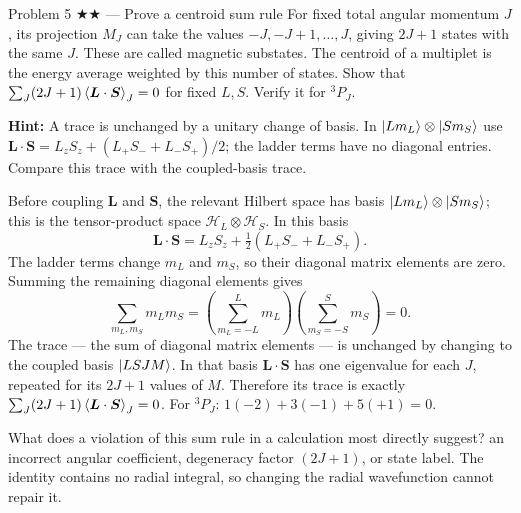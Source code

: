 \documentclass[11pt]{article}
\begin{document}
\begin{problem}{Problem 5 ★★ — Prove a centroid sum rule}
For fixed total angular momentum $J$, its projection $M_J$ can take the values
$-J,-J+1,\ldots,J$, giving $2J+1$ states with the same $J$. These are called
magnetic substates. The centroid of a multiplet is the energy average weighted
by this number of states. Show that
$\sum_J(2J+1)\left\langle \bm L\cdot\bm S\right\rangle_J=0$ for fixed $L,S$. Verify it for
$^3P_J$.

\textbf{Hint:} A trace is unchanged by a unitary change of basis.
In $\lvert Lm_L\rangle\otimes\lvert Sm_S\rangle$ use
$\bm L\cdot\bm S=L_zS_z+(L_+S_-+L_-S_+)/2$; the ladder terms have no
diagonal entries. Compare this trace with the coupled-basis trace.
\end{problem}
\begin{solution}
Before coupling $\bm L$ and $\bm S$, the relevant Hilbert space has basis
$\lvert Lm_L\rangle\otimes\lvert Sm_S\rangle$; this is the tensor-product space
$\mathcal H_L\otimes\mathcal H_S$. In this basis
\[
\bm L\cdot\bm S=L_zS_z+\tfrac12(L_+S_-+L_-S_+).
\]
The ladder terms change $m_L$ and $m_S$, so their diagonal matrix elements are
zero. Summing the remaining diagonal elements gives
\[
\sum_{m_L,m_S}m_Lm_S=
\left(\sum_{m_L=-L}^{L}m_L\right)
\left(\sum_{m_S=-S}^{S}m_S\right)=0.
\]
The trace --- the sum of diagonal matrix elements --- is unchanged by changing
to the coupled basis $\lvert LSJM\rangle$. In that basis $\bm L\cdot\bm S$ has one
eigenvalue for each $J$, repeated for its $2J+1$ values of $M$. Therefore its
trace is exactly $\sum_J(2J+1)\left\langle \bm L\cdot\bm S\right\rangle_J=0$. For $^3P_J$:
$1(-2)+3(-1)+5(+1)=0$.
\end{solution}
\begin{quiz}
What does a violation of this sum rule in a calculation most directly suggest?
\answer an incorrect angular coefficient, degeneracy factor $(2J+1)$, or state
label. The identity contains no radial integral, so changing the radial
wavefunction cannot repair it.
\end{quiz}
\end{document}
